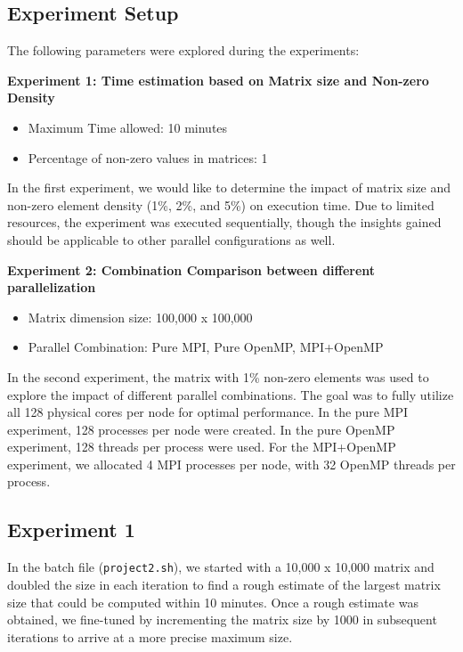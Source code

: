 \documentclass[
]{article}
\begin{document}
\subsection{Experiment Setup}\label{experiment-setup}

The following parameters were explored during the experiments:

\textbf{Experiment 1: Time estimation based on Matrix size and Non-zero
Density}

\begin{itemize}
  \item Maximum Time allowed: 10 minutes
  \item Percentage of non-zero values in matrices: 1%
\end{itemize}

In the first experiment, we would like to determine the impact of matrix
size and non-zero element density (1\%, 2\%, and 5\%) on execution time.
Due to limited resources, the experiment was executed sequentially,
though the insights gained should be applicable to other parallel
configurations as well.

\textbf{Experiment 2: Combination Comparison between different
parallelization}

\begin{itemize}
  \item Matrix dimension size: 100,000 x 100,000
  \item Parallel Combination: Pure MPI, Pure OpenMP, MPI+OpenMP
\end{itemize}

In the second experiment, the matrix with 1\% non-zero elements was used
to explore the impact of different parallel combinations. The goal was
to fully utilize all 128 physical cores per node for optimal
performance. In the pure MPI experiment, 128 processes per node were
created. In the pure OpenMP experiment, 128 threads per process were
used. For the MPI+OpenMP experiment, we allocated 4 MPI processes per
node, with 32 OpenMP threads per process.

\subsection{Experiment 1}\label{experiment-1}

In the batch file (\texttt{project2.sh}), we started with a 10,000 x
10,000 matrix and doubled the size in each iteration to find a rough
estimate of the largest matrix size that could be computed within 10
minutes. Once a rough estimate was obtained, we fine-tuned by
incrementing the matrix size by 1000 in subsequent iterations to arrive
at a more precise maximum size.
\end{document}
